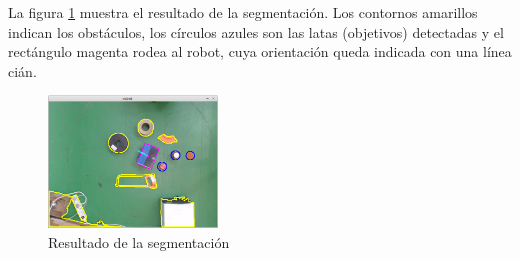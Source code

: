 La figura \ref{fig:segmentation} muestra el resultado de la segmentación. Los contornos amarillos indican los obstáculos, los círculos azules son las latas (objetivos) detectadas y el rectángulo magenta rodea al robot, cuya orientación queda indicada con una línea cián.\\

\begin{figure}[H]
        \centering
        \includegraphics[width=0.4\textwidth]{images/segmentation.png}
        \caption{Resultado de la segmentación}
        \label{fig:segmentation}
\end{figure} 
